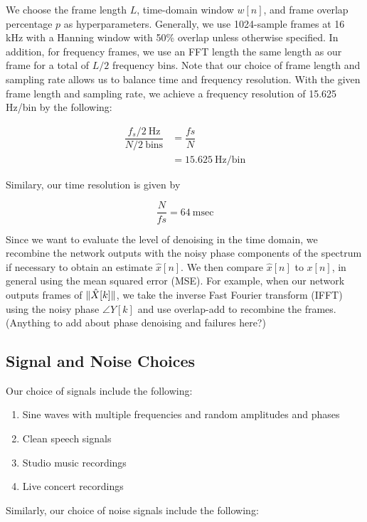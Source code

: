 We choose the frame length $L$, time-domain window $w[n]$, and frame overlap percentage $p$ as hyperparameters. Generally, we use 1024-sample frames at 16 kHz with a Hanning window with 50\% overlap unless otherwise specified. In addition, for frequency frames, we use an FFT length the same length as our frame for a total of $L/2$ frequency bins. Note that our choice of frame length and sampling rate allows us to balance time and frequency resolution. With the given frame length and sampling rate, we achieve a frequency resolution of 15.625 Hz/bin by the following:

\begin{align}
\dfrac{f_s/2 \:\text{Hz}}{N/2 \:\text{bins}} &= \dfrac{fs}{N}\\
&= 15.625 \:\text{Hz/bin}
\end{align}

Similary, our time resolution is given by

\begin{equation}
\dfrac{N}{fs} = 64 \:\text{msec} 
\end{equation}

Since we want to evaluate the level of denoising in the time domain, we recombine the network outputs with the noisy phase components of the spectrum if necessary to obtain an estimate $\hat{x}[n]$. We then compare $\hat{x}[n]$ to $x[n]$, in general using the mean squared error (MSE). For example, when our network outputs frames of $\lVert\hat{X}[k]\rVert$, we take the inverse Fast Fourier transform (IFFT) using the noisy phase $\angle{Y[k]}$ and use overlap-add to recombine the frames. (Anything to add about phase denoising and failures here?)

\subsection{Signal and Noise Choices}
Our choice of signals include the following:

\begin{enumerate}
    \item Sine waves with multiple frequencies and random amplitudes and phases
    \item Clean speech signals
    \item Studio music recordings
    \item Live concert recordings
\end{enumerate}

Similarly, our choice of noise signals include the following:

